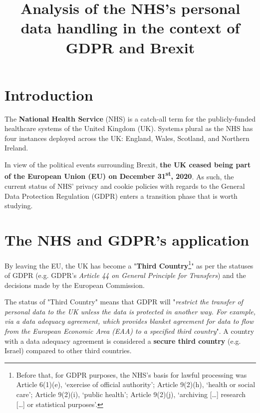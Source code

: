 \documentclass[twocolumn, letterpaper,13pt]{scrartcl}
\begin{document}
    \title{\color{seablue}Analysis of the NHS's personal data handling in the context of GDPR and Brexit}

	\maketitle
	
    \section*{Introduction}
    
        The \textbf{National Health Service}\cite{link} (NHS) is a catch-all term for the publicly-funded healthcare systems of the United Kingdom (UK). System\textit{s} plural as the NHS has four instances deployed across the UK: England, Wales, Scotland, and Northern Ireland.
        
        In view of the political events surrounding Brexit, \textbf{the UK ceased being part of the European Union (EU) on December 31\textsuperscript{st}, 2020}. As such, the current status of NHS' privacy and cookie policies with regards to the General Data Protection Regulation (GDPR) enters a transition phase that is worth studying.

	\section{The NHS and GDPR's application}
	
	    By leaving the EU, the UK has become a "\textbf{Third Country}\footnote{Before that, for GDPR purposes, the NHS’s basis for lawful processing was Article 6(1)(e), ‘exercise of official authority’; Article 9(2)(h), ‘health or social care’; Article 9(2)(i), ‘public health’; Article 9(2)(j), ‘archiving […] research […] or statistical purposes’\cite{nhsengland}.}" as per the statuses of GDPR\cite{thirdCountriesStatus} (e.g. GDPR's \textit{Article 44 on General Principle for Transfers}) and the decisions made by the European Commission\cite{thirdCountryNote}. 
	    
	    The status of "Third Country" means that GDPR will "\textit{restrict the transfer of personal data to the UK unless the data is protected in another way. For example, via a data adequacy agreement, which provides blanket agreement for data to flow from the European Economic Area (EAA) to a specified third country}"\cite{dataAdequacyAndBrexit}. A country with a data adequacy agreement is considered a \textbf{secure third country} (e.g. Israel) compared to other third countries. 
	    
\end{document}
